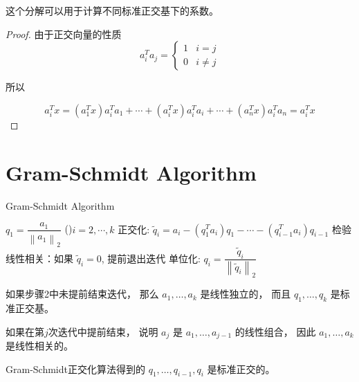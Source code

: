     这个分解可以用于计算不同标准正交基下的系数。 

\begin{proof}
    由于正交向量的性质
    \begin{equation} a_{i}^{T} a_{j}=\left\{\begin{array}{ll}1 & i=j \\ 0 & i \neq j\end{array}\right. \end{equation}

    所以

    \begin{equation} a_{i}^{T} x=\left(a_{1}^{T} x\right) a_{i}^{T} a_{1}+\cdots+\left(a_{i}^{T} x\right) a_{i}^{T} a_{i}+\cdots+\left(a_{n}^{T} x\right) a_{i}^{T} a_{n}=a_{i}^{T} x \end{equation}
\end{proof}

\section{Gram-Schmidt Algorithm}
\label{Chap:Gram-Schmidt Algorithm}
\begin{algorithm}[htbp]
    \caption{Gram-Schmidt Algorithm}
    $ q_{1}= \dfrac{a_{1}}{\left\|a_{1}\right\|_{2}}   $\;
    \While(){$i=2,\cdots,k$}{
        正交化: $ \widetilde{q}_{i}=a_{i}-\left(q_{1}^{T} a_{i}\right) q_{1}-\cdots-\left(q_{i-1}^{T} a_{i}\right) q_{i-1} $\;
        检验线性相关：如果 $ \widetilde{q}_{i}=0 $, 提前退出迭代\;
        单位化: $
        q_{i}=\dfrac{\widetilde{q}_{i}}{\left\|\widetilde{q}_{i}\right\|_{2}}$\;
    }
\end{algorithm}

如果步骤2中未提前结束迭代， 那么 $ a_{1}, \ldots, a_{k} $ 是线性独立的， 而且 $ q_{1}, \ldots, q_{k} $ 是标准正交基。 

如果在第$j$次迭代中提前结束， 说明 $ a_{j} $ 是 $ a_{1}, \ldots, a_{j-1} $ 的线性组合， 因此 $ a_{1}, \ldots, a_{k} $ 是线性相关的。 

\begin{theorem}
    \label{thm: qs-are-orthogonal}
    Gram-Schmidt正交化算法得到的
    $q_{1}, \ldots, q_{i-1}, q_{i} $ 是标准正交的。 
\end{theorem}

